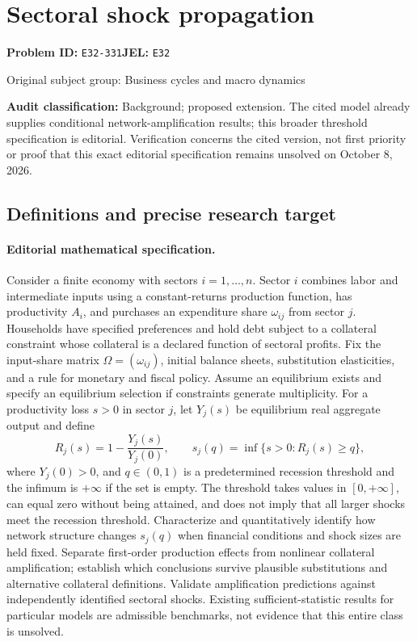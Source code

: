 \documentclass[11pt,a4paper]{article}
\begin{document}
\section*{Sectoral shock propagation}
\textbf{Problem ID:} \texttt{E32-331}\quad \textbf{JEL:} \texttt{E32}\par
\label{problem:OP-0232}
{\sffamily\small\color{muted}Original subject group: Business cycles and macro dynamics\par}
\label{definitions:problem:30007513}
\textbf{Audit classification:} Background; proposed extension. The cited model already supplies conditional network-amplification results; this broader threshold specification is editorial. Verification concerns the cited version, not first priority or proof that this exact editorial specification remains unsolved on October 8, 2026.
\subsection*{Definitions and precise research target}
\paragraph{Editorial mathematical specification.} Consider a finite economy with sectors \(i=1,\ldots,n\). Sector \(i\) combines labor and intermediate inputs using a constant-returns production function, has productivity \(A_i\), and purchases an expenditure share \(\omega_{ij}\) from sector \(j\). Households have specified preferences and hold debt subject to a collateral constraint whose collateral is a declared function of sectoral profits. Fix the input-share matrix \(\Omega=(\omega_{ij})\), initial balance sheets, substitution elasticities, and a rule for monetary and fiscal policy. Assume an equilibrium exists and specify an equilibrium selection if constraints generate multiplicity.
For a productivity loss \(s>0\) in sector \(j\), let \(Y_j(s)\) be equilibrium real aggregate output and define
\[
R_j(s)=1-\frac{Y_j(s)}{Y_j(0)},\qquad
s_j(q)=\inf\{s>0:R_j(s)\ge q\},
\]
where \(Y_j(0)>0\), and \(q\in(0,1)\) is a predetermined recession threshold and the infimum is \(+\infty\) if the set is empty. The threshold takes values in \([0,+\infty]\), can equal zero without being attained, and does not imply that all larger shocks meet the recession threshold. Characterize and quantitatively identify how network structure changes \(s_j(q)\) when financial conditions and shock sizes are held fixed. Separate first-order production effects from nonlinear collateral amplification; establish which conclusions survive plausible substitutions and alternative collateral definitions. Validate amplification predictions against independently identified sectoral shocks. Existing sufficient-statistic results for particular models are admissible benchmarks, not evidence that this entire class is unsolved.
\end{document}
